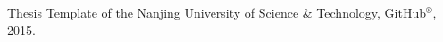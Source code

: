 
\begin{publications}{99}

\item Thesis Template of the Nanjing University of Science \& Technology, GitHub$^{\circledR}$, 2015.

\end{publications}
